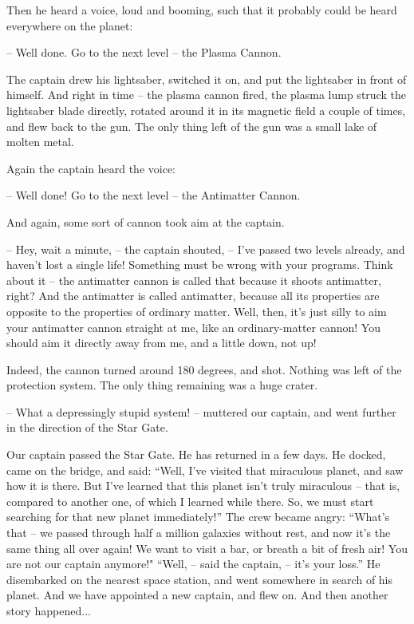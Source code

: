 \documentclass[ebook,twoside,final,openright]{memoir}
\begin{document}
\par
Then he heard a voice, loud and booming, such that it probably could be heard everywhere on the planet:\par
– Well done. Go to the next level – the Plasma Cannon.\par
The captain drew his lightsaber, switched it on, and put the lightsaber in front of himself. And right in time – the plasma cannon fired, the plasma lump struck the lightsaber blade directly, rotated around it in its magnetic field a couple of times, and flew back to the gun. The only thing left of the gun was a small lake of molten metal.\par
\par
Again the captain heard the voice:\par
– Well done! Go to the next level – the Antimatter Cannon.\par
And again, some sort of cannon took aim at the captain.\par
– Hey, wait a minute, – the captain shouted, – I’ve passed two levels already, and haven’t lost a single life! Something must be wrong with your programs. Think about it – the antimatter cannon is called that because it shoots antimatter, right? And the antimatter is called antimatter, because all its properties are opposite to the properties of ordinary matter. Well, then, it’s just silly to aim your antimatter cannon straight at me, like an ordinary-matter cannon! You should aim it directly away from me, and a little down, not up!\par
\par
Indeed, the cannon turned around 180 degrees, and shot. Nothing was left of the protection system. The only thing remaining was a huge crater.\par
– What a depressingly stupid system! – muttered our captain, and went further in the direction of the Star Gate.\par
\par
Our captain passed the Star Gate. He has returned in a few days. He docked, came on the bridge, and said: “Well, I’ve visited that miraculous planet, and saw how it is there. But I’ve learned that this planet isn’t truly miraculous – that is, compared to another one, of which I learned while there. So, we must start searching for that new planet immediately!” The crew became angry: “What’s that – we passed through half a million galaxies without rest, and now it’s the same thing all over again! We want to visit a bar, or breath a bit of fresh air! You are not our captain anymore!" “Well, – said the captain, – it’s your loss.” He disembarked on the nearest space station, and went somewhere in search of his planet. And we have appointed a new captain, and flew on. And then another story happened...
\end{document}

